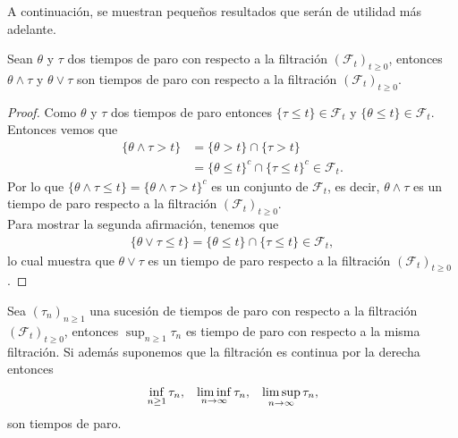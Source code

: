 A continuación, se muestran pequeños resultados que serán de utilidad más adelante.
\begin{lemma}
	\label{paromaxmin}
	Sean $\theta$ y $\tau$ dos tiempos de paro con respecto a la filtración $(\mathcal{F}_t)_{t \geq 0}$, entonces $\theta \wedge \tau$ y $\theta \vee \tau$ son tiempos de paro con respecto a la filtración $(\mathcal{F}_t)_{t \geq 0}$.
\end{lemma}
\begin{proof}
	Como $\theta$ y $\tau$ dos tiempos de paro entonces $\{\tau \leq t \} \in \mathcal{F}_t$ y $\{\theta \leq t \} \in \mathcal{F}_t$. Entonces vemos que
	\begin{align*}
		\{\theta \wedge \tau > t \} & = \{ \theta > t \} \cap \{ \tau > t \} \\
		& = \{ \theta \leq t \}^{c} \cap \{ \tau \leq t \}^{c} \in \mathcal{F}_t.
	\end{align*}
	Por lo que $\{\theta \wedge \tau \leq t \} = \{\theta \wedge \tau > t \}^{c}$ es un conjunto de $\mathcal{F}_t$, es decir, $\theta \wedge \tau$ es un tiempo de paro respecto a la filtración $(\mathcal{F}_t)_{t \geq 0}$. \\

	Para mostrar la segunda afirmación, tenemos que
	\begin{align*}
		\{ \theta \vee \tau \leq t \} = \{ \theta \leq t \} \cap \{ \tau \leq t \} \in \mathcal{F}_t,
	\end{align*}
	lo cual muestra que $\theta \vee \tau$ es un tiempo de paro respecto a la filtración $(\mathcal{F}_t)_{t \geq 0}$.
\end{proof}

\begin{lemma}
	Sea $(\tau_n)_{n \geq 1}$ una sucesión de tiempos de paro con respecto a la filtración $(\mathcal{F}_t)_{t \geq 0}$, entonces $\sup_{n \geq 1} \tau_n$ es tiempo de paro con respecto a la misma filtración. Si además suponemos que la filtración es continua por la derecha entonces
	\begin{align*}
		\inf_{n \geq 1} \tau_n, \hspace{0.3cm} \liminf_{n \rightarrow \infty} \tau_n, \hspace{0.3cm} \limsup_{n \rightarrow \infty} \tau_n,
	\end{align*}
	son tiempos de paro.
\end{lemma}

